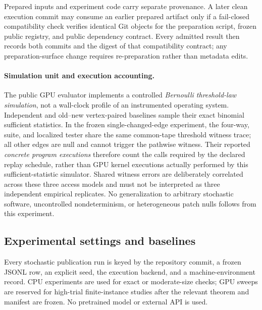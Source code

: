 

Prepared inputs and experiment code carry separate provenance.  A later clean
execution commit may consume an earlier prepared artifact only if a fail-closed
compatibility check verifies identical Git objects for the preparation script,
frozen public registry, and public dependency contract.  Every admitted result
then records both commits and the digest of that compatibility contract; any
preparation-surface change requires re-preparation rather than metadata edits.

\paragraph{Simulation unit and execution accounting.}
The public GPU evaluator implements a controlled \emph{Bernoulli threshold-law
simulation}, not a wall-clock profile of an instrumented operating system.
Independent and old--new vertex-paired baselines sample their exact binomial
sufficient statistics. In the frozen single-changed-edge experiment, the
four-way, suite, and localized tester share the same common-tape threshold
witness trace; all other edges are null and cannot trigger the pathwise witness.
Their reported \emph{concrete program executions} therefore count the calls
required by the declared replay schedule, rather than GPU kernel executions
actually performed by this sufficient-statistic simulator. Shared witness
errors are deliberately correlated across these three access models and
must not be interpreted as three independent empirical replicates. No
generalization to arbitrary stochastic software, uncontrolled nondeterminism,
or heterogeneous patch nulls follows from this experiment.
\subsection{Experimental settings and baselines}

Every stochastic publication run is keyed by the repository commit, a frozen
JSONL row, an explicit seed, the execution backend, and a machine-environment
record. CPU experiments are used for exact or moderate-size checks; GPU sweeps
are reserved for high-trial finite-instance studies after the relevant theorem
and manifest are frozen. No pretrained model or external API is used.

